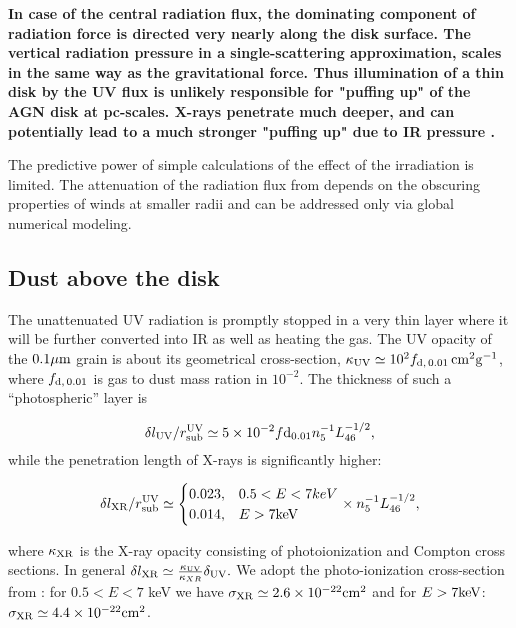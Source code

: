 \documentclass[12pt,english,preprint]{aastex}
\newcommand{\mybf}{\bf}
\newcommand{\su}[2]{#1_{\rm #2}}
\begin{document}
{\mybf
In case of the central radiation flux, the dominating component of radiation force is directed very 
nearly along the disk surface.  The vertical radiation pressure in a single-scattering approximation, scales in the same way as the gravitational
force. Thus illumination of a thin disk by the UV flux is unlikely responsible for "puffing up" of the AGN disk at pc-scales.
X-rays penetrate much deeper, and can 
potentially lead to a much stronger 
"puffing up" due to IR pressure \citep{Chang_etal07,Dorodnitsyn16}.
}

The predictive power of simple calculations of the effect of the irradiation
is limited. The attenuation of the radiation flux from depends on
the obscuring properties of winds at smaller radii and can be addressed
only via global numerical modeling.

\subsection{Dust above the disk}

The unattenuated UV radiation is promptly stopped in a very thin layer
where it will be further converted into IR as well as heating the
gas. The UV opacity of the $0.1{\rm \mu m}$ grain is about its geometrical
cross-section, $\kappa_{{\rm UV}}\simeq10^{2}f_{{\rm d,\,0.01}}\,{\rm cm^{2}g^{-1}}$,
where $f_{{\rm d,\,0.01}}$ is gas to dust mass ration in $10^{-2}$.
The thickness of such a ``photospheric'' layer is

\begin{equation}
\delta l_{{\rm UV}}/r_{{\rm sub}}^{{\rm UV}}\simeq5\times10^{-2}f{\rm d}_{0.01}n_{5}^{-1}L_{46}^{-1/2}\mbox{,}
\label{ConversionLayerUV}
\end{equation}
while the penetration length of
X-rays is significantly higher:

\begin{equation}
\delta l_{{\rm XR}}/\su{r}{sub}^{\rm UV}\simeq\begin{cases}
0.023, & 0.5<E<7keV\\
0.014, & E>7{\rm keV}
\end{cases}\times n_{5}^{-1}L_{46}^{-1/2},\label{ConversionLayerXRay}
\end{equation}

where $\kappa_{{\rm XR}}$ is the X-ray opacity consisting of photoionization
and Compton cross sections. In general $\delta l_{{\rm XR}}\simeq\frac{\kappa_{{\rm UV}}}{\kappa_{XR}}\delta_{{\rm UV}}.$
We adopt the photo-ionization cross-section from \citep{Maloney96}: for
$0.5<E<7$ keV we have $\sigma_{{\rm XR}}\simeq2.6\times10^{-22}\text{cm}^{2}$
and for $E>7{\rm keV}$: $\sigma_{{\rm XR}}\simeq4.4\times10^{-22}\text{cm}^{2}$.
\end{document}
